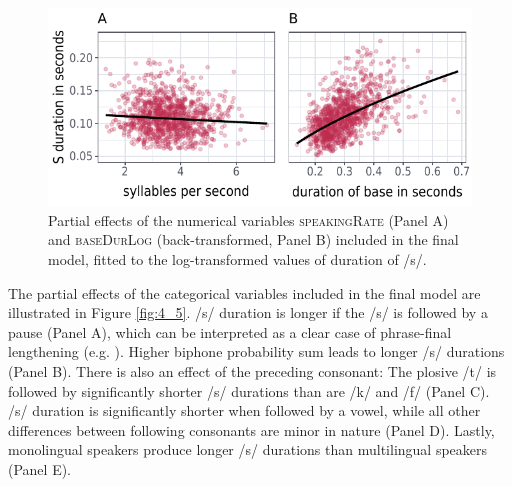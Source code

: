 \begin{figure}
    \centering
    \includegraphics[width=1\textwidth]{figures/fig4.4.pdf}
    \caption{Partial effects of the numerical variables \textsc{speakingRate} (Panel A) and \textsc{baseDurLog} (back-transformed, Panel B) included in the final model, fitted to the log-transformed values of duration of /s/.}
    \label{fig:4_4}
\end{figure}


The partial effects of the categorical variables included in the final model are illustrated in Figure \ref{fig:4_5}. /s/ duration is longer if the /s/ is followed by a pause (Panel A), which can be interpreted as a clear case of phrase-final lengthening (e.g. \cite{Cooper1981}). Higher biphone probability sum leads to longer /s/ durations (Panel B). There is also an effect of the preceding consonant: The plosive /t/ is followed by significantly shorter /s/ durations than are /k/ and /f/ (Panel C). /s/ duration is significantly shorter when followed by a vowel, while all other differences between following consonants are minor in nature (Panel D). Lastly, monolingual speakers produce longer /s/ durations than multilingual speakers (Panel E).


